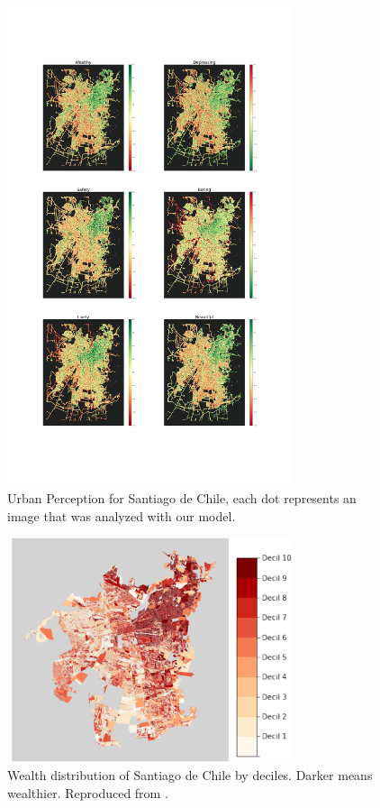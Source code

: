 \begin{figure}[ht]
	\begin{center}
	\includegraphics[width=0.75\textwidth]{./figures/colormaps.jpg}
	\caption[Urban Perception for Santiago de Chile]{
        Urban Perception for Santiago de Chile, each dot represents an image that
        was analyzed with our model.
    }
	\label{fig:colormaps}
	\end{center}
\end{figure}


\begin{figure}[ht]
	\begin{center}
	\includegraphics[width=0.75\textwidth]{./figures/eod.png}
	\caption[Wealth distribution of Santiago de Chile]{
        Wealth distribution of Santiago de Chile by deciles. Darker means wealthier.
        Reproduced from .
    }
	\label{fig:eod}
	\end{center}
\end{figure}

